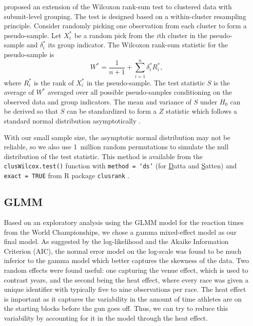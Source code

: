 \documentclass[12pt, letterpaper]{article}
\begin{document}
\citet{datta2005rank} proposed an extension of the Wilcoxon rank-sum test to
clustered data with subunit-level grouping. The test is designed based on a
within-cluster resampling principle. Consider randomly picking one observation
from each cluster to form a pseudo-sample. Let $X_i^*$ be a random pick from the
$i$th cluster in the pseudo-sample and $\delta_i^*$ its group indicator. The
Wilcoxon rank-sum statistic for the pseudo-sample is
\[
W^* = \frac{1}{n + 1} + \sum_{i=1}^{n} \delta_{i}^{*} R_{i}^{*},
\]
where $R_{i}^{*}$ is the rank of $X_{i}^{*}$ in the pseudo-sample.
The test statistic $S$ is the average of $W^*$ averaged over all possible
pseudo-samples conditioning on the observed data and group indicators.
The mean and variance of $S$ under $H_0$ can be derived so that $S$ can be
standardized to form a $Z$ statistic which follows a standard normal distribution
asymptotically \citep[p.910]{datta2005rank}.


With our small sample size, the asymptotic normal distribution may not be
reliable, so we also use 1~million random permutations to simulate the null 
distribution of the test statistic.
This method is available from the \texttt{clusWilcox.test()} function
with \texttt{method = `ds'} (for \underline{D}atta and \underline{S}atten) and 
\texttt{exact = TRUE} from R package
\texttt{clusrank} \citep{jiang2020wilcoxon}. 


\subsection{GLMM}\label{sec:glmm}
Based on an exploratory analysis using the GLMM model for the reaction times
from the World Championships, we chose a gamma mixed-effect model as our 
final model. As suggested by the log-likelihood and the Akaike Information
Criterion (AIC), the normal error model on the log-scale was found to be
much inferior to the gamma model which better captures the skewness of the
data. Two random effects were found useful: one capturing the venue effect, which
is used to contrast years, and the second being the heat effect, where every
race was given a unique identifier with typically five to nine observations
per race. The heat effect is important as it captures the variability in the
amount of time athletes are on the starting blocks before the gun goes off.
Thus, we can try to reduce this variability by accounting for it in the model
through the heat effect.
\end{document}
